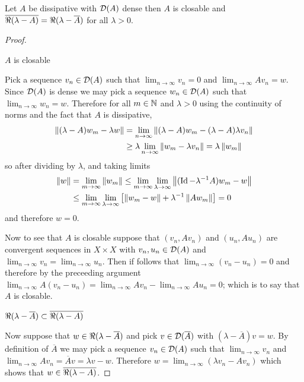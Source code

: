\begin{prop}\label{DissipativeDenseDomainImpliesClosable}Let $A$ be dissipative with $\mathcal{D}(A)$ dense then $A$ is closable and $\overline{\Re(\lambda -A)} = \Re(\lambda - \overline{A})$ for all $\lambda > 0$.
\end{prop}
\begin{proof}
\begin{clm} $A$ is closable
\end{clm}
Pick a sequence $v_n \in \mathcal{D}(A)$ such that $\lim_{n \to \infty} v_n = 0$ and $\lim_{n \to \infty} A v_n = w$.  Since $\mathcal{D}(A)$ is dense we may pick a sequence $w_n \in \mathcal{D}(A)$ such that $\lim_{n \to \infty} w_n = w$.  Therefore for all $m \in \mathbb{N}$ and $\lambda > 0$ using the continuity of norms and the fact that $A$ is dissipative,
\begin{align*}
\left \lVert (\lambda - A) w_m - \lambda w \right \rVert &= \lim_{n \to \infty} \left \lVert (\lambda - A) w_m - (\lambda - A) \lambda v_n \right \rVert \\
&\geq \lambda \lim_{n \to \infty} \left \lVert w_m - \lambda v_n \right \rVert = \lambda \left \lVert w_m \right \rVert
\end{align*}
so after dividing by $\lambda$, and taking limits
\begin{align*}
\left \lVert w \right \rVert &= \lim_{m \to \infty} \left \lVert w_m \right \rVert \leq \lim_{m \to \infty} \lim_{\lambda \to \infty}\left \lVert  (\operatorname*{Id} - \lambda^{-1} A) w_m - w \right \rVert \\
&\leq \lim_{m \to \infty} \lim_{\lambda \to \infty} \left[ \left \lVert w_m - w \right \rVert + \lambda^{-1} \left \lVert A w_m \right \rVert \right] = 0
\end{align*}
and therefore $w = 0$.  

Now to see that $A$ is closable suppose that $(v_n, A v_n)$ and  $(u_n, A u_n)$ are convergent sequences in $X \times X$ with $v_n, u_n \in \mathcal{D}(A)$ and $\lim_{n \to \infty} v_n = \lim_{n \to \infty} u_n$.  Then if follows that 
$\lim_{n \to \infty} (v_n - u_n) = 0$ and therefore by the preceeding argument $\lim_{n \to \infty} A(v_n - u_n) = \lim_{n \to \infty} Av_n - \lim_{n \to \infty}  A u_n = 0$; which is to say that $A$ is closable.

\begin{clm} $\Re(\lambda - \overline{A}) \subset\overline{\Re(\lambda -A)}$
\end{clm}
Now suppose that $w \in \Re(\lambda - \overline{A})$ and pick $v \in \mathcal{D}(\overline{A})$ with $(\lambda - \overline{A})v = w$.  By definition of $\overline{A}$ we may pick
a sequence $v_n \in \mathcal{D}(A)$ such that $\lim_{n \to \infty} v_n$ and $\lim_{n \to \infty} A v_n = \overline{A} v = \lambda v - w$.  Therefore $w = \lim_{n \to \infty} (\lambda v_n - A v_n)$
which shows that $w \in \overline{\Re(\lambda -A)}$.  


\end{proof}
